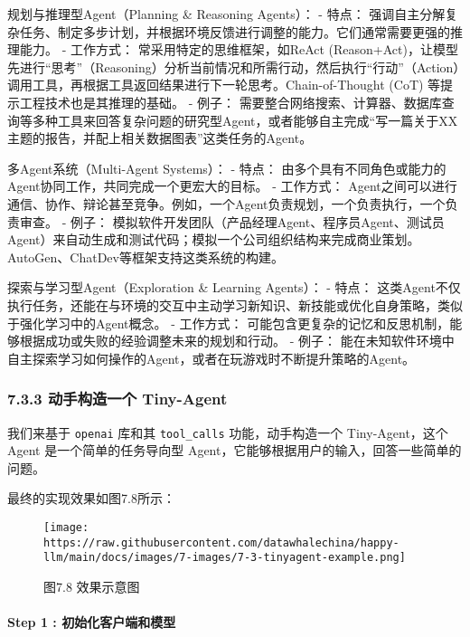 \documentclass[
]{article}
\begin{document}
规划与推理型Agent（Planning \& Reasoning Agents）： - 特点：
强调自主分解复杂任务、制定多步计划，并根据环境反馈进行调整的能力。它们通常需要更强的推理能力。
- 工作方式： 常采用特定的思维框架，如ReAct
(Reason+Act)，让模型先进行``思考''（Reasoning）分析当前情况和所需行动，然后执行``行动''（Action）调用工具，再根据工具返回结果进行下一轮思考。Chain-of-Thought
(CoT) 等提示工程技术也是其推理的基础。 - 例子：
需要整合网络搜索、计算器、数据库查询等多种工具来回答复杂问题的研究型Agent，或者能够自主完成``写一篇关于XX主题的报告，并配上相关数据图表''这类任务的Agent。

多Agent系统（Multi-Agent Systems）： - 特点：
由多个具有不同角色或能力的Agent协同工作，共同完成一个更宏大的目标。 -
工作方式：
Agent之间可以进行通信、协作、辩论甚至竞争。例如，一个Agent负责规划，一个负责执行，一个负责审查。
- 例子：
模拟软件开发团队（产品经理Agent、程序员Agent、测试员Agent）来自动生成和测试代码；模拟一个公司组织结构来完成商业策划。AutoGen、ChatDev等框架支持这类系统的构建。

探索与学习型Agent（Exploration \& Learning Agents）： - 特点：
这类Agent不仅执行任务，还能在与环境的交互中主动学习新知识、新技能或优化自身策略，类似于强化学习中的Agent概念。
- 工作方式：
可能包含更复杂的记忆和反思机制，能够根据成功或失败的经验调整未来的规划和行动。
- 例子：
能在未知软件环境中自主探索学习如何操作的Agent，或者在玩游戏时不断提升策略的Agent。

\subsubsection{7.3.3 动手构造一个
Tiny-Agent}\label{ux52a8ux624bux6784ux9020ux4e00ux4e2a-tiny-agent}

我们来基于 \texttt{openai} 库和其 \texttt{tool\_calls}
功能，动手构造一个 Tiny-Agent，这个 Agent 是一个简单的任务导向型
Agent，它能够根据用户的输入，回答一些简单的问题。

最终的实现效果如图7.8所示：

\begin{figure}[htbp]\centering
\texttt{[image: https://raw.githubusercontent.com/datawhalechina/happy-llm/main/docs/images/7-images/7-3-tinyagent-example.png]}
\caption{图7.8 效果示意图}
\end{figure}

\paragraph{Step 1 :
初始化客户端和模型}\label{step-1-ux521dux59cbux5316ux5ba2ux6237ux7aefux548cux6a21ux578b}
\end{document}
